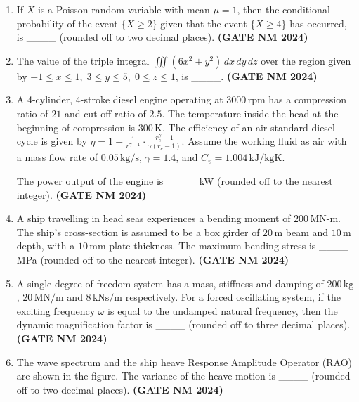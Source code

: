 \documentclass[journal,15pt,onecolumn]{IEEEtran}
\theoremstyle{remark}
\begin{document}
\begin{enumerate}
\item 
If $X$ is a Poisson random variable with mean $\mu = 1$, then the conditional probability of the event $\{X \geq 2\}$ given that the event $\{X \geq 4\}$ has occurred, is \_\_\_\_ (rounded off to two decimal places).\hfill \textbf{ (GATE NM 2024)}

\item 
The value of the triple integral 
$
\iiint (6x^2 + y^2) \, dx \, dy \, dz
$
over the region given by $-1 \leq x \leq 1,\; 3 \leq y \leq 5,\; 0 \leq z \leq 1$, is \_\_\_\_.\hfill \textbf{ (GATE NM 2024)}

\item 
A 4-cylinder, 4-stroke diesel engine operating at $3000 \,\text{rpm}$ has a compression ratio of $21$ and cut-off ratio of $2.5$. The temperature inside the head at the beginning of compression is $300 \,\text{K}$. The efficiency of an air standard diesel cycle is given by 
$
\eta = 1 - \frac{1}{r^{\gamma - 1}} \cdot \frac{r_c^\gamma - 1}{\gamma (r_c - 1)}.
$
Assume the working fluid as air with a mass flow rate of $0.05 \,\text{kg/s}$, $\gamma = 1.4$, and $C_v = 1.004 \,\text{kJ/kgK}$.

The power output of the engine is \_\_\_\_ kW (rounded off to the nearest integer).\hfill \textbf{ (GATE NM 2024)}

\item 
A ship travelling in head seas experiences a bending moment of $200 \,\text{MN-m}$. The ship’s cross-section is assumed to be a box girder of $20 \,\text{m}$ beam and $10 \,\text{m}$ depth, with a $10 \,\text{mm}$ plate thickness. The maximum bending stress is \_\_\_\_ MPa (rounded off to the nearest integer).\hfill \textbf{ (GATE NM 2024)}

\item 
A single degree of freedom system has a mass, stiffness and damping of $200 \,\text{kg}$, $20 \,\text{MN/m}$ and $8 \,\text{kNs/m}$ respectively. For a forced oscillating system, if the exciting frequency $\omega$ is equal to the undamped natural frequency, then the dynamic magnification factor is \_\_\_\_ (rounded off to three decimal places).\hfill \textbf{ (GATE NM 2024)}

\item 
The wave spectrum and the ship heave Response Amplitude Operator (RAO) are shown in the figure. The variance of the heave motion is \_\_\_\_ (rounded off to two decimal places).\hfill \textbf{ (GATE NM 2024)}


\end{enumerate}
\end{document}
